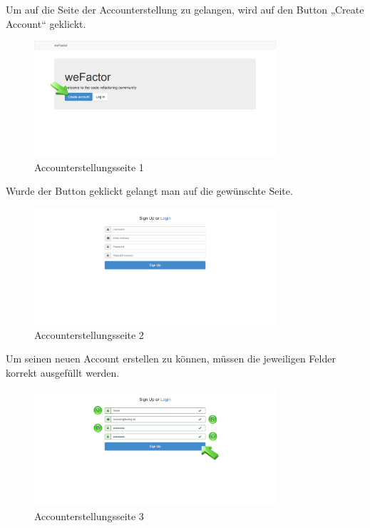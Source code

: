 Um auf die Seite der Accounterstellung zu gelangen, wird auf den Button „Create Account“ geklickt.

\begin{figure}[H]
    \centering
    \includegraphics[width=0.8\textwidth]{Bilder/2.png}
    \caption{Accounterstellungsseite 1}
    \label{fig:accounterstellungsseite1}
\end{figure}


Wurde der Button geklickt gelangt man auf die gewünschte Seite.

\begin{figure}[H]
    \centering
    \includegraphics[width=0.8\textwidth]{Bilder/4.png}
    \caption{Accounterstellungsseite 2 }
    \label{fig:accounterstellungsseite2}
\end{figure}



Um seinen neuen Account erstellen zu können, müssen die jeweiligen Felder korrekt ausgefüllt werden.

\begin{figure}[H]
    \centering
    \includegraphics[width=0.8\textwidth]{Bilder/5.png}
    \caption{Accounterstellungsseite 3 }
    \label{fig:accounterstellungsseite3}
\end{figure}


